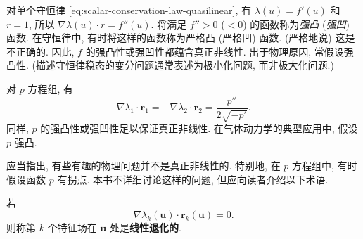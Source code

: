 \begin{Example}
\label{ex:scalar-genuine-nonlinearity}
对单个守恒律 \eqref{eq:scalar-conservation-law-quasilinear}, 有 $\lambda(u)=f'(u)$ 和 $r=1$, 所以 $\nabla\lambda(u)\cdot r=f''(u)$. 将满足 $f''>0$ ($<0$) 的函数称为\emph{强凸} (\emph{强凹}) 函数. 在守恒律中, 有时将这样的函数称为严格凸 (严格凹) 函数. (严格地说) 这是不正确的. 因此, $f$ 的强凸性或强凹性都蕴含真正非线性. 出于物理原因, 常假设强凸性. (描述守恒律稳态的变分问题通常表述为极小化问题, 而非极大化问题.)
\end{Example}

\begin{Example}
\label{ex:p-system-genuine-nonlinearity}
对 $p$ 方程组, 有
\begin{equation}\label{eq:p-system-genuine-nonlinearity}
\nabla\lambda_1\cdot\bm{r}_1=-\nabla\lambda_2\cdot\bm{r}_2=\dfrac{p''}{2\sqrt{-p'}}.
\end{equation}
同样, $p$ 的强凸性或强凹性足以保证真正非线性. 在气体动力学的典型应用中, 假设 $p$ 强凸.
\end{Example}

应当指出, 有些有趣的物理问题并不是真正非线性的. 特别地, 在 $p$ 方程组中, 有时假设函数 $p$ 有拐点. 本书不详细讨论这样的问题, 但应向读者介绍以下术语.

\begin{Definition}
\label{def:linear-degeneracy}
若
\begin{equation}\label{eq:linear-degeneracy-definition}
\nabla\lambda_k(\bm{u})\cdot\bm{r}_k(\bm{u})=0.
\end{equation}
则称第 $k$ 个特征场在 $\bm{u}$ 处是\textbf{线性退化的}.
\end{Definition}

